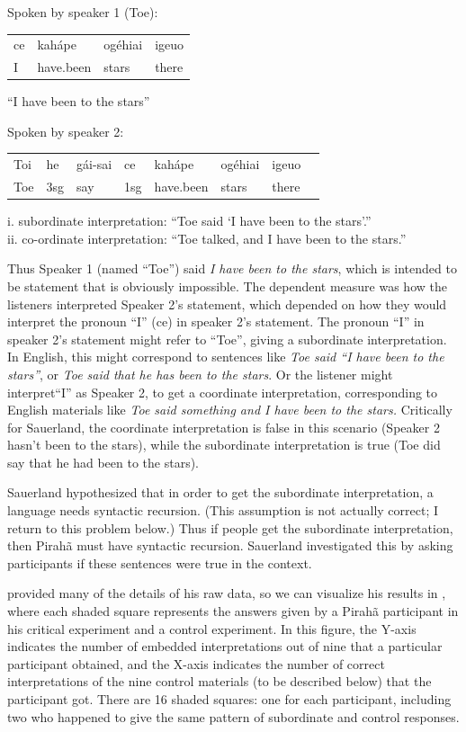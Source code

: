 \documentclass{article}
\begin{document}
\eal
\label{sauerland_ex}
\ex \label{sauerland_ex1} Spoken by speaker 1 (Toe):\\
\begin{tabular}{l l l l}
ce & kahápe & ogéhiai & igeuo \\ 
I & have.been & stars & there\\
\end{tabular}

``I have been to the stars''

\ex \label{sauerland_ex2} Spoken by speaker 2:\\
\begin{tabular}{l l l l l l l l}
Toi & he & gái-sai & ce & kahápe & ogéhiai & igeuo \\
Toe & 3sg & say & 1sg & have.been & stars & there\\
\end{tabular}


i. subordinate interpretation: ``Toe said ‘I have been to the stars’.''\\
ii. co-ordinate interpretation: ``Toe talked, and I have been to the stars.''
\zl

Thus Speaker 1 (named ``Toe'') said \textit{I have been to the stars}, which is intended to be statement that is obviously impossible. The dependent measure was how the listeners interpreted Speaker 2's statement, which depended on how they would interpret the pronoun ``I'' (ce) in speaker 2’s statement. The pronoun ``I'' in speaker 2’s statement might refer to ``Toe'', giving  a subordinate interpretation. In English, this might correspond to sentences like \textit{Toe said ``I have been to the stars''}, or \textit{Toe said that he has been to the stars}. Or the listener might interpret``I'' as Speaker 2, to get a coordinate interpretation, corresponding to English materials like \textit{Toe said something and I have been to the stars.}  Critically for Sauerland, the coordinate interpretation is false in this scenario (Speaker 2 hasn’t been to the stars), while the subordinate interpretation is true (Toe did say that he had been to the stars).

Sauerland hypothesized that in order to get the subordinate interpretation, a language needs syntactic recursion. (This assumption is not actually correct; I return to this problem below.) Thus if people get the subordinate interpretation, then Pirahã must have syntactic recursion. Sauerland investigated this by asking participants if these sentences were true in the context. 

\cite{sauerland2018false} provided many of the details of his raw data, so we can visualize his results in , where each shaded square represents the answers given by a Pirahã participant in his critical experiment and a control experiment. In this figure, the Y-axis indicates the number of embedded interpretations out of nine that a particular participant obtained, and the X-axis indicates the number of correct interpretations of the nine control materials (to be described below) that the participant got. There are 16 shaded squares: one for each participant, including two who happened to give the same pattern of subordinate and control responses.
\end{document}
